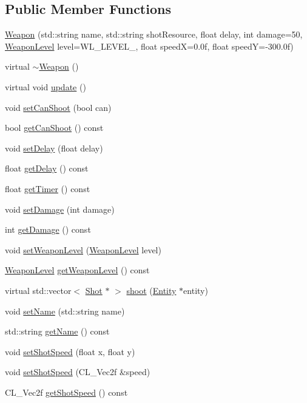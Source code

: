 \subsection*{Public Member Functions}
\begin{DoxyCompactItemize}
\item 
\hyperlink{class_weapon_ab4b3563b5a33565e7d1a4b6fb57e2cd1}{Weapon} (std::string name, std::string shotResource, float delay, int damage=50, \hyperlink{class_weapon_a72f39b8add8bdd807d7fe4337c07da08}{WeaponLevel} level=WL\_\-LEVEL\_, float speedX=0.0f, float speedY=-\/300.0f)
\item 
virtual \hyperlink{class_weapon_a420e7ba3d2017e6de3e93eb579cfd3fa}{$\sim$Weapon} ()
\item 
virtual void \hyperlink{class_weapon_a1b3f76c5275b67f0bb8073157a27e736}{update} ()
\item 
void \hyperlink{class_weapon_abcbbdb991394a963f7cf8d1585d10f49}{setCanShoot} (bool can)
\item 
bool \hyperlink{class_weapon_afd98e4ce63e16c705c905ace92008ab0}{getCanShoot} () const 
\item 
void \hyperlink{class_weapon_a89ee2083d898147a3b9b81772360dcd1}{setDelay} (float delay)
\item 
float \hyperlink{class_weapon_a810d3b7900f80e0d5442a7b64fb821de}{getDelay} () const 
\item 
float \hyperlink{class_weapon_a969c097dea5e6758464729a70d25abb3}{getTimer} () const 
\item 
void \hyperlink{class_weapon_a54e4b500dcc3f5c3d02df6f1c29ddbea}{setDamage} (int damage)
\item 
int \hyperlink{class_weapon_a2ca6127e73e6afe823b5daf59d9e93c5}{getDamage} () const 
\item 
void \hyperlink{class_weapon_aaf7e542b8a4cc373ee03e3b3cc049064}{setWeaponLevel} (\hyperlink{class_weapon_a72f39b8add8bdd807d7fe4337c07da08}{WeaponLevel} level)
\item 
\hyperlink{class_weapon_a72f39b8add8bdd807d7fe4337c07da08}{WeaponLevel} \hyperlink{class_weapon_a72b2684194963c4a2816a6cc80785fac}{getWeaponLevel} () const 
\item 
virtual std::vector$<$ \hyperlink{class_shot}{Shot} $\ast$ $>$ \hyperlink{class_weapon_a7d8147f09d84813b47fdd57bea34e800}{shoot} (\hyperlink{class_entity}{Entity} $\ast$entity)
\item 
void \hyperlink{class_weapon_aad6104491364c92ec52e5a930d80c6b6}{setName} (std::string name)
\item 
std::string \hyperlink{class_weapon_a4460496820d443081e7a5446bf3ba473}{getName} () const 
\item 
void \hyperlink{class_weapon_a62e3119e661e057f2f2223b01f84c67d}{setShotSpeed} (float x, float y)
\item 
void \hyperlink{class_weapon_a43582f3968383919f67976c09d2d71ea}{setShotSpeed} (CL\_\-Vec2f \&speed)
\item 
CL\_\-Vec2f \hyperlink{class_weapon_ac97cb1672a349da38e9b40886520e049}{getShotSpeed} () const 
\end{DoxyCompactItemize}


